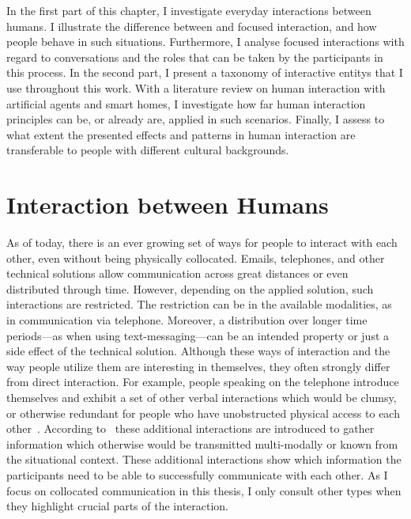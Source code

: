 In the first part of this chapter, I investigate everyday interactions between humans.
I illustrate the difference between  and \gls{focused interaction}, and how people behave in such situations.
Furthermore, I analyse \glspl{focused interaction} with regard to \glspl{conversation} and the roles that can be taken by the participants in this process.
In the second part, I present a taxonomy of \glspl{interactive entity} that I use throughout this work.
With a literature review on human interaction with \glspl{artificial agent} and \glspl{smart home}, I investigate how far human interaction principles can be, or already are, applied in such scenarios.
Finally, I assess to what extent the presented effects and patterns in human interaction are transferable to people with different cultural backgrounds.

\section{Interaction between Humans}\label{sec.rw.hi}

As of today, there is an ever growing set of ways for people to interact with each other, even without being physically collocated.
Emails, telephones, and other technical solutions allow communication across great distances or even distributed through time.
However, depending on the applied solution, such interactions are restricted.
The restriction can be in the available modalities, as in communication via telephone.
Moreover, a distribution over longer time periods---as when using text-messaging---can be an intended property or just a side effect of the technical solution.
Although these ways of interaction and the way people utilize them are interesting in themselves, they often strongly differ from direct interaction.
For example, people speaking on the telephone introduce themselves and exhibit a set of other verbal interactions which would be clumsy, or otherwise redundant for people who have unobstructed physical access to each other~\cite[]{Auer}.
According to~ these additional interactions are introduced to gather information which otherwise would be transmitted multi-modally or known from the situational context.
These additional interactions show which information the participants need to be able to successfully communicate with each other.
As I focus on collocated communication in this thesis, I only consult other types when they highlight crucial parts of the interaction.

